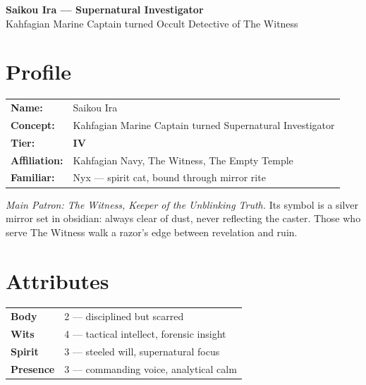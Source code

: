 \documentclass[11pt]{article}
\begin{document}
\begin{center}
{\LARGE \textbf{Saikou Ira --- Supernatural Investigator}}\\[4pt]
{\large Kahfagian Marine Captain turned Occult Detective of The Witness}
\end{center}

\section*{Profile}
\begin{tabular}{@{}ll}
\textbf{Name:} & Saikou Ira \\
\textbf{Concept:} & Kahfagian Marine Captain turned Supernatural Investigator \\
\textbf{Tier:} & \textbf{IV} \\
\textbf{Affiliation:} & Kahfagian Navy, The Witness, The Empty Temple \\
\textbf{Familiar:} & Nyx --- spirit cat, bound through mirror rite
\end{tabular}

\smallskip
\noindent
\emph{Main Patron: The Witness, Keeper of the Unblinking Truth.}  
Its symbol is a silver mirror set in obsidian: always clear of dust, never reflecting the caster.  
Those who serve The Witness walk a razor's edge between revelation and ruin.

\section*{Attributes}
\begin{tabular}{@{}ll}
\textbf{Body}  & 2 --- disciplined but scarred \\
\textbf{Wits}  & 4 --- tactical intellect, forensic insight \\
\textbf{Spirit} & 3 --- steeled will, supernatural focus \\
\textbf{Presence} & 3 --- commanding voice, analytical calm
\end{tabular}

\end{document}
